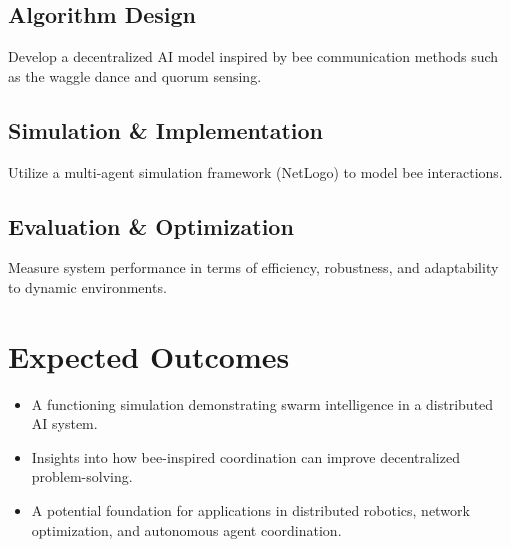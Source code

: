 \documentclass[a4paper,12pt]{article}
\begin{document}
\subsection{Algorithm Design}
Develop a decentralized AI model inspired by bee communication methods such as the waggle dance and quorum sensing.

\subsection{Simulation \& Implementation}
Utilize a multi-agent simulation framework (NetLogo) to model bee interactions.

\subsection{Evaluation \& Optimization}
Measure system performance in terms of efficiency, robustness, and adaptability to dynamic environments.

\section{Expected Outcomes}
\begin{itemize}
    \item A functioning simulation demonstrating swarm intelligence in a distributed AI system.
    \item Insights into how bee-inspired coordination can improve decentralized problem-solving.
    \item A potential foundation for applications in distributed robotics, network optimization, and autonomous agent coordination.
\end{itemize}
\end{document}
